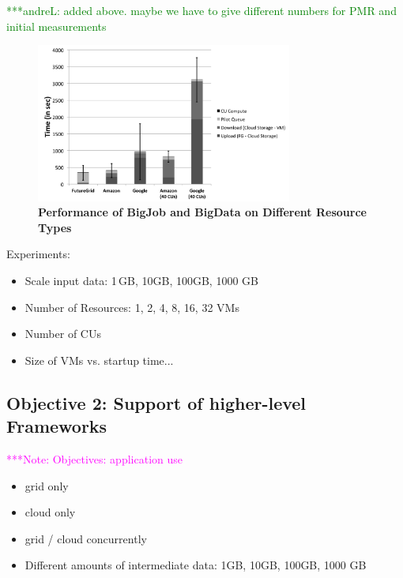 \documentclass[times]{cpeauth}
\newcommand{\jhanote}[1]{ {\textcolor{red} { ***shantenu: #1 }}}
\newcommand{\alnote}[1]{ {\textcolor{green} { ***andreL: #1 }}}
\newcommand{\note}[1]{ {\textcolor{magenta} { ***Note: #1 }}}
\newcommand{\alnote}[1]{}
\newcommand{\jhanote}[1]{}
\newcommand{\note}[1]{}
\begin{document}
\alnote{added above. maybe we have to give different numbers for PMR and 
initial measurements}
\begin{figure}[htbp]
	\centering
		\includegraphics[width=0.75\textwidth]{performance/pd_google_aws.pdf}
	\caption{\textbf{Performance of BigJob and BigData on Different Resource Types}}
	\label{fig:performance_pd_google_aws}
\end{figure}



Experiments:
\begin{itemize}
	\item Scale input data: 1\,GB, 10GB, 100GB, 1000 GB
	\item Number of Resources: 1, 2, 4, 8, 16, 32 VMs
	\item Number of CUs
	\item Size of VMs vs. startup time...
\end{itemize}



\subsection{Objective 2: Support of higher-level Frameworks}

\note{Objectives: application use}



\begin{itemize}
	\item grid only
	\item cloud only
	\item grid / cloud concurrently
	\item  Different amounts of intermediate data: 1GB, 10GB, 100GB, 1000 GB	
\end{itemize}
\end{document}
